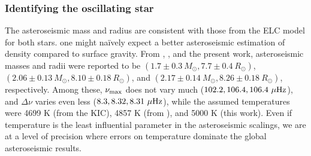 \subsubsection{Identifying the oscillating star}\label{identifying}
The asteroseismic mass and radius are consistent with those from the ELC model for both stars.  one might na{\"i}vely expect a better asteroseismic estimation of density compared to surface gravity.  From \citet{gau13}, \citet{gau14}, and the present work, asteroseismic masses and radii were reported to be $(1.7 \pm 0.3 \ M_\odot, 7.7 \pm 0.4 \ R_\odot)$, $(2.06 \pm 0.13 \ M_\odot, 8.10 \pm 0.18 \ R_\odot)$, and $(2.17 \pm 0.14 \ M_\odot, 8.26 \pm 0.18 \ R_\odot)$, respectively. Among these, $\nu_{\rm{max}}$ does not vary much ($102.2, 106.4, 106.4 \ \mu\rm{Hz}$), and $\Delta \nu$ varies even less ($8.3, 8.32, 8.31 \ \mu\rm{Hz}$), while the assumed temperatures were 4699 K (from the KIC), 4857 K (from \citealt{hub14.2}), and 5000 K (this work). Even if temperature is the least influential parameter in the asteroseismic scalings, we are at a level of precision where errors on temperature dominate the global asteroseismic results. 

